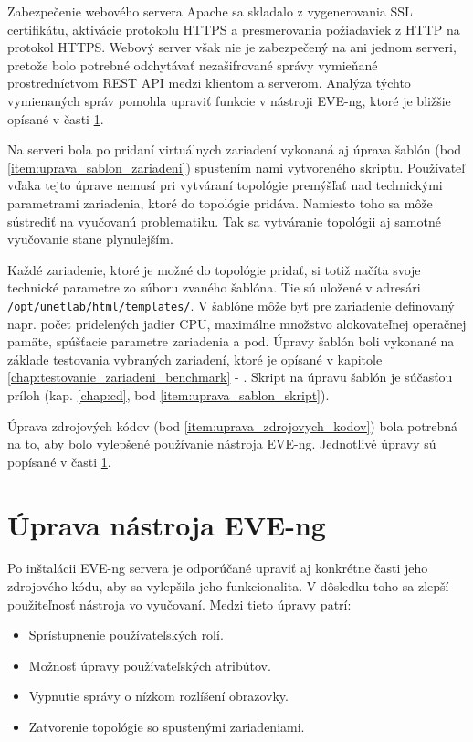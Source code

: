 Zabezpečenie webového servera Apache sa skladalo z vygenerovania SSL certifikátu, aktivácie protokolu HTTPS a presmerovania požiadaviek z HTTP na protokol HTTPS. Webový server však nie je zabezpečený na ani jednom serveri, pretože bolo potrebné odchytávať nezašifrované správy vymieňané prostredníctvom REST API medzi klientom a serverom. Analýza týchto vymienaných správ pomohla upraviť funkcie v nástroji EVE-ng, ktoré je bližšie opísané v časti \ref{chap:eve_ng_uprava_zdroj_kodov}.

Na serveri bola po pridaní virtuálnych zariadení vykonaná aj úprava šablón (bod \ref{item:uprava_sablon_zariadeni}) spustením nami vytvoreného skriptu. Používateľ vďaka tejto úprave nemusí pri vytváraní topológie premýšľať nad technickými parametrami zariadenia, ktoré do topológie pridáva. Namiesto toho sa môže sústrediť na vyučovanú problematiku. Tak sa vytváranie topológii aj samotné vyučovanie stane plynulejším. 

Každé zariadenie, ktoré je možné do topológie pridať, si totiž načíta svoje technické parametre zo súboru zvaného šablóna. Tie sú uložené v adresári \texttt{/opt/unetlab/html/templates/}. V šablóne môže byť pre zariadenie definovaný napr. počet pridelených jadier CPU, maximálne množstvo alokovateľnej operačnej pamäte, spúšťacie parametre zariadenia a pod. Úpravy šablón boli vykonané na základe testovania vybraných zariadení, ktoré je opísané v kapitole \ref{chap:testovanie_zariadeni_benchmark} - . Skript na úpravu šablón je súčasťou príloh (kap. \ref{chap:cd}, bod \ref{item:uprava_sablon_skript}).

Úprava zdrojových kódov (bod \ref{item:uprava_zdrojovych_kodov}) bola potrebná na to, aby bolo vylepšené používanie nástroja EVE-ng. Jednotlivé úpravy sú popísané v časti \ref{chap:eve_ng_uprava_zdroj_kodov}.





\section{Úprava nástroja EVE-ng}
\label{chap:eve_ng_uprava_zdroj_kodov}

Po inštalácii EVE-ng servera je odporúčané upraviť aj konkrétne časti jeho zdrojového kódu, aby sa vylepšila jeho funkcionalita. V dôsledku toho sa zlepší použiteľnosť nástroja vo vyučovaní. Medzi tieto úpravy patrí:

\begin{itemize}[noitemsep]
    \item Sprístupnenie používateľských rolí.
    \item Možnosť úpravy používateľských atribútov.
    \item Vypnutie správy o nízkom rozlíšení obrazovky.
    \item Zatvorenie topológie so spustenými zariadeniami.
\end{itemize}


